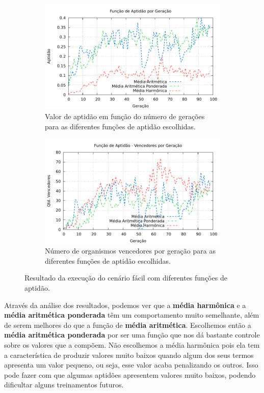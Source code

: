 \begin{figure}[H]
\centering
	\begin{subfigure}[b]{0.4\textwidth}
        \includegraphics[width=\textwidth]{fig/fitness-value-comparison.pdf}
        \caption{Valor de aptidão em função do número de gerações para as
        diferentes funções de aptidão escolhidas.}
	\end{subfigure}
	\begin{subfigure}[b]{0.4\textwidth}
        \includegraphics[width=\textwidth]{fig/fitness-winners-comparison.pdf}
        \caption{Número de organismos vencedores por geração para as diferentes
        funções de aptidão escolhidas.}
	\end{subfigure}

    \caption{Resultado da execução do cenário fácil com diferentes funções de
    aptidão.}
	\label{fig:fitness-experiment}
\end{figure}

Através da análise dos resultados, podemos ver que a \textbf{média harmônica} e
a \textbf{média aritmética ponderada} têm um comportamento muito semelhante,
além de serem melhores do que a função de \textbf{média aritmética}. Escolhemos
então a \textbf{média aritmética ponderada} por ser uma função que nos dá
bastante controle sobre os valores que a compõem. Não escolhemos a média
harmônica pois ela tem a característica de produzir valores muito baixos quando
algum dos seus termos apresenta um valor pequeno, ou seja, esse valor acaba
penalizando os outros. Isso pode fazer com que algumas aptidões apresentem
valores muito baixos, podendo dificultar alguns treinamentos futuros.

